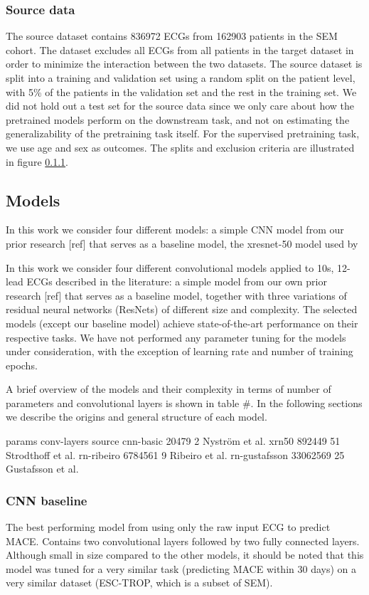 \documentclass[journal,twoside,web]{ieeecolor}
\begin{document}
\subsubsection{Source data}
The source dataset contains 836972 ECGs from 162903 patients in the SEM cohort. The dataset excludes all ECGs from all patients in the target dataset in order to minimize the interaction between the two datasets. The source dataset is split into a training and validation set using a random split on the patient level, with 5\% of the patients in the validation set and the rest in the training set. We did not hold out a test set for the source data since we only care about how the pretrained models perform on the downstream task, and not on estimating the generalizability of the pretraining task itself. For the supervised pretraining task, we use age and sex as outcomes. The splits and exclusion criteria are illustrated in figure \ref{}.  

\subsection{Models}
In this work we consider four different models: a simple CNN model from our prior research [ref] that serves as a baseline model, the xresnet-50 model used by \cite{strodthoff2020}

In this work we consider four different convolutional models applied to 10s, 12-lead ECGs described in the literature: a simple model from our own prior research [ref] that serves as a baseline model, together with three variations of residual neural networks (ResNets) of different size and complexity. The selected models (except our baseline model) achieve state-of-the-art performance on their respective tasks. We have not performed any parameter tuning for the models under consideration, with the exception of learning rate and number of training epochs. 

A brief overview of the models and their complexity in terms of number of parameters and convolutional layers is shown in table #. In the following sections we describe the origins and general structure of each model.

		  params	conv-layers	source
cnn-basic	   20479	2		Nyström et al.
xrn50		  892449	51		Strodthoff et al.
rn-ribeiro	 6784561	9		Ribeiro et al.
rn-gustafsson	33062569	25		Gustafsson et al.


\subsubsection{CNN baseline}
The best performing model from \cite{nystrom2024} using only the raw input ECG to predict MACE. Contains two convolutional layers followed by two fully connected layers. Although small in size compared to the other models, it should be noted that this model was tuned for a very similar task (predicting MACE within 30 days) on a very similar dataset (ESC-TROP, which is a subset of SEM).
\end{document}
